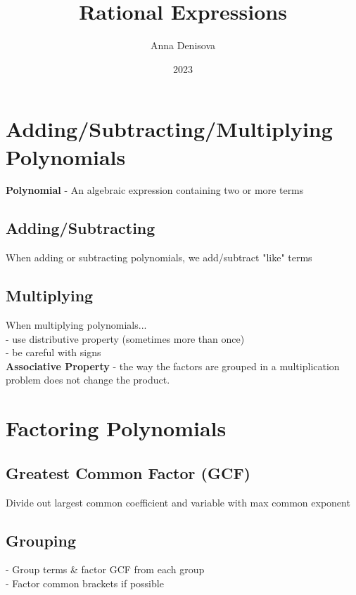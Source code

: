 \documentclass{article}
\title{Rational Expressions}
\author{Anna Denisova}
\date{2023}
\begin{document}
\maketitle



\newpage
\section{Adding/Subtracting/Multiplying Polynomials}

\textbf{Polynomial} - An algebraic expression containing two or more terms

\subsection*{Adding/Subtracting}
When adding or subtracting polynomials, we add/subtract "like" terms

\subsection*{Multiplying}
When multiplying polynomials...\\
- use distributive property (sometimes more than once) \\
- be careful with signs\\

\noindent
\textbf{Associative Property} - the way the factors are grouped in a multiplication problem does not change the product.



\section{Factoring Polynomials}

\subsection*{Greatest Common Factor (GCF)}
Divide out largest common coefficient and variable with max common exponent 

\subsection*{Grouping}
- Group terms & factor GCF from each group\\
- Factor common brackets if possible 
\end{document}
